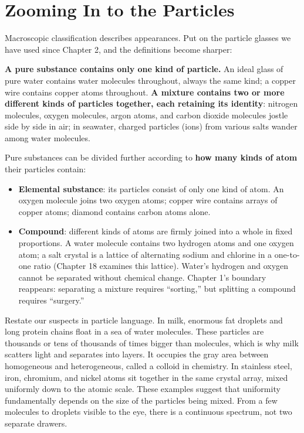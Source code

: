 \section{Zooming In to the Particles}

Macroscopic classification describes appearances. Put on the particle glasses we have used since Chapter 2, and the definitions become sharper:

\textbf{A pure substance contains only one kind of particle.} An ideal glass of pure water contains water molecules throughout, always the same kind; a copper wire contains copper atoms throughout. \textbf{A mixture contains two or more different kinds of particles together, each retaining its identity}: nitrogen molecules, oxygen molecules, argon atoms, and carbon dioxide molecules jostle side by side in air; in seawater, charged particles (ions) from various salts wander among water molecules.

Pure substances can be divided further according to \textbf{how many kinds of atom} their particles contain:

\begin{itemize}[itemsep=2pt]
\item \textbf{Elemental substance}: its particles consist of only one kind of atom. An oxygen molecule joins two oxygen atoms; copper wire contains arrays of copper atoms; diamond contains carbon atoms alone.
\item \textbf{Compound}: different kinds of atoms are firmly joined into a whole in fixed proportions. A water molecule contains two hydrogen atoms and one oxygen atom; a salt crystal is a lattice of alternating sodium and chlorine in a one-to-one ratio (Chapter 18 examines this lattice). Water's hydrogen and oxygen cannot be separated without chemical change. Chapter 1's boundary reappears: separating a mixture requires ``sorting,'' but splitting a compound requires ``surgery.''
\end{itemize}

Restate our suspects in particle language. In milk, enormous fat droplets and long protein chains float in a sea of water molecules. These particles are thousands or tens of thousands of times bigger than molecules, which is why milk scatters light and separates into layers. It occupies the gray area between homogeneous and heterogeneous, called a colloid in chemistry. In stainless steel, iron, chromium, and nickel atoms sit together in the same crystal array, mixed uniformly down to the atomic scale. These examples suggest that uniformity fundamentally depends on the size of the particles being mixed. From a few molecules to droplets visible to the eye, there is a continuous spectrum, not two separate drawers.

